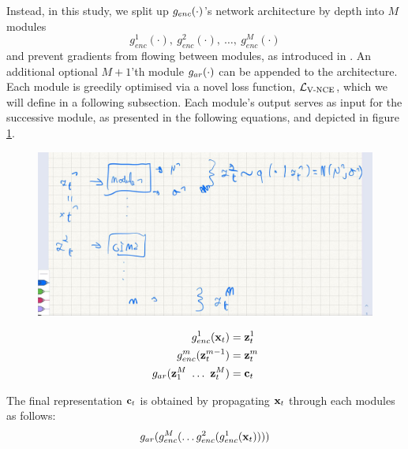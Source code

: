 			Instead, in this study, we split up $g_{enc}(\cdot)$'s network architecture by depth into $M$ modules 
			$$g_{enc}^1(\cdot),~ g_{enc}^2(\cdot),~\dots,~g_{enc}^M(\cdot)$$ 
			and prevent gradients from flowing between modules, as introduced in \cite{lowePuttingEndEndtoEnd2020}. An additional optional $M+1$'th module $g_{ar}(\cdot)$ can be appended to the architecture. Each module is greedily optimised via a novel loss function, $\mathcal{L}_{\text{V-NCE}}$, which we will define in a following subsection. Each module's output serves as input for the successive module, as presented in the following equations, and depicted in figure \ref{fig:variationalgim}.
			
			\begin{figure} %
				\centering
				\includegraphics[width=0.7\linewidth]{temp_variational_gim}
				\caption{}
				\label{fig:variationalgim}
			\end{figure}
			
			\begin{align*} %
				g_{enc}^1(\xt) &= \zt^1 \\
				g_{enc}^m(\zt^{m-1}) &= \zt^m \\
				g_{ar}(\z_1^M ~ \dots ~ \zt^M) &= \ct
			\end{align*}
			
			The final representation $\mathbf{c}_t$ is obtained by propagating $\mathbf{x}_t$ through each modules as follows:
			$$ g_{ar}(g_{enc}^M ( \dots	g_{enc}^2(g_{enc}^1(\mathbf{x}_t)))) $$
			
			
			
					
